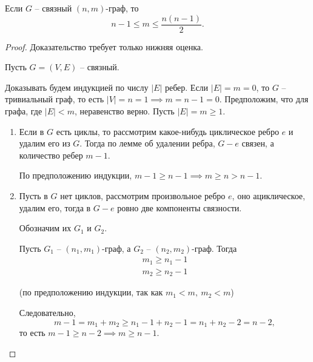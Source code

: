 \begin{theorem}\label{theorem:1}
    Если $ G $ -- связный $ (n,m) $-граф, то
    \[
        n-1 \leqslant m \leqslant \frac{n(n-1)}{2}.
    \]
\end{theorem}

\begin{proof}
    Доказательство требует только нижняя оценка.

    Пусть $ G=(V,E) $ -- связный.

    Доказывать будем индукцией по числу $ | E | $ ребер. Если $ | E | = m =0 $, то $ G $ -- тривиальный граф, то есть $ | V | =n = 1 \implies m = n-1 = 0 $. Предположим, что для графа, где $ | E | < m $, неравенство верно. Пусть $ | E | = m \geqslant 1 $.
    \begin{enumerate}
        \item Если в $ G $ есть циклы, то рассмотрим какое-нибудь циклическое ребро $ e $ и удалим его из $ G $. Тогда по лемме об удалении ребра, $ G-e $ связен, а количество ребер $ m-1 $.

              По предположению индукции, $ m-1 \geqslant n-1 \implies m \geqslant n > n-1 $.
        \item Пусть в $ G $ нет циклов, рассмотрим произвольное ребро $ e $, оно ациклическое, удалим его, тогда в $ G - e $ ровно две компоненты связности.

              Обозначим их $ G_1 $ и $ G_2 $.
              \begin{figure}[H]
                  \centering
                  \label{fig:fig_22}
              \end{figure}

              Пусть $ G_1 $ -- $ (n_1,m_1) $-граф, а $ G_2 $ -- $ (n_2,m_2) $-граф. Тогда
              \[
                  \begin{array}{l}
                      m_1 \geqslant n_1 - 1 \\
                      m_2 \geqslant n_2-1
                  \end{array}
              \]
              \begin{center}
                  (по предположению индукции, так как $ m_1<m, \ m_2<m $)
              \end{center}

              Следовательно,
              \[
                  m-1 = m_1 + m_2 \geqslant n_1-1+n_2-1=n_1+n_2-2 = n-2,
              \]
              то есть $ m-1 \geqslant n-2 \implies m \geqslant n-1 $.
    \end{enumerate}
\end{proof}

